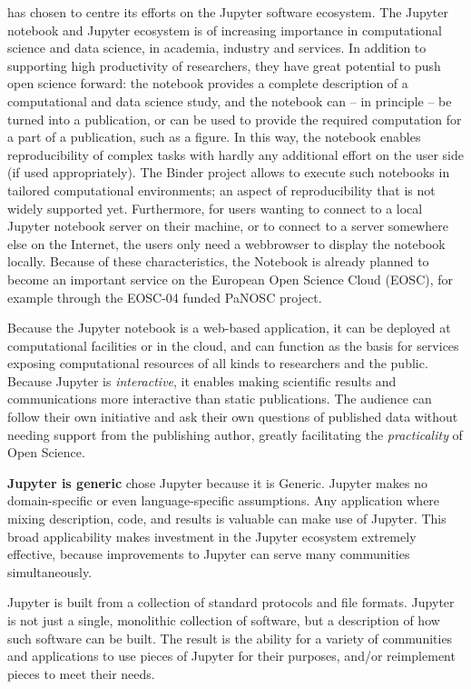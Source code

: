 \TheProject has chosen to centre its efforts on the Jupyter software
ecosystem.  The Jupyter notebook and Jupyter ecosystem is of
increasing importance in computational science and data science, in
academia, industry and services. In addition to supporting high
productivity of researchers, they have great potential to push open
science forward: the notebook provides a complete description of a
computational and data science study, and the notebook can -- in
principle -- be turned into a publication, or can be used to provide
the required computation for a part of a publication, such as a
figure. In this way, the notebook enables reproducibility of complex
tasks with hardly any additional effort on the user side (if used
appropriately). The Binder project allows to execute such notebooks in
tailored computational environments; an aspect of reproducibility that
is not widely supported yet. Furthermore, for users wanting to connect
to a local Jupyter notebook server on their machine, or to connect to
a server somewhere else on the Internet, the users only need a
webbrowser to display the notebook locally. Because of these
characteristics, the Notebook is already planned to become an
important service on the European Open Science Cloud (EOSC), for
example through the EOSC-04 funded PaNOSC project.


Because the Jupyter notebook is a web-based application, it can be
deployed at computational facilities or in the cloud, and can function
as the basis for services exposing computational resources of all
kinds to researchers and the public.  Because Jupyter is
\textit{interactive}, it enables making scientific results and
communications more interactive than static publications.  The
audience can follow their own initiative and ask their own questions
of published data without needing support from the publishing author,
greatly facilitating the \textit{practicality} of Open Science.

\textbf{Jupyter is generic} \TheProject chose Jupyter because it is
Generic.  Jupyter makes no domain-specific or even language-specific
assumptions.  Any application where mixing description, code, and
results is valuable can make use of Jupyter.  This broad applicability
makes investment in the Jupyter ecosystem extremely effective, because
improvements to Jupyter can serve many communities simultaneously.

Jupyter is built from a collection of standard protocols and file
formats.  Jupyter is not just a single, monolithic collection of
software, but a description of how such software can be built.  The
result is the ability for a variety of communities and applications to
use pieces of Jupyter for their purposes, and/or reimplement pieces to
meet their needs.

